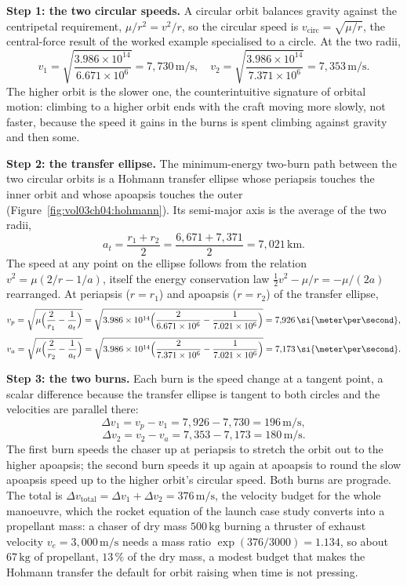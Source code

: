 \textbf{Step 1: the two circular speeds.} A circular orbit balances
gravity against the centripetal requirement, $\mu/r^{2}=v^{2}/r$, so
the circular speed is $v_{\text{circ}}=\sqrt{\mu/r}$, the central-force
result of the worked example specialised to a circle. At the two radii,
\[
v_{1}=\sqrt{\frac{3.986\times 10^{14}}{6.671\times 10^{6}}}=7{,}730\,\si{
\meter\per\second}, \quad
v_{2}=\sqrt{\frac{3.986\times 10^{14}}{7.371\times 10^{6}}}=7{,}353\,\si{
\meter\per\second}.
\]
The higher orbit is the slower one, the counterintuitive signature of
orbital motion: climbing to a higher orbit ends with the craft moving
more slowly, not faster, because the speed it gains in the burns is
spent climbing against gravity and then some.

\textbf{Step 2: the transfer ellipse.} The minimum-energy two-burn
path between the two circular orbits is a Hohmann transfer ellipse whose
periapsis touches the inner orbit and whose apoapsis touches the outer
(Figure~\ref{fig:vol03ch04:hohmann}). Its semi-major axis is the
average of the two radii,
\[
a_{t}=\frac{r_{1}+r_{2}}{2}=\frac{6{,}671+7{,}371}{2}=7{,}021\,\si{\kilo
\meter}.
\]
The speed at any point on the ellipse follows from the
 relation $v^{2}=\mu(2/r-1/a)$, itself the energy
conservation law $\tfrac{1}{2}v^{2}-\mu/r=-\mu/(2a)$ rearranged. At
periapsis ($r=r_{1}$) and apoapsis ($r=r_{2}$) of the transfer ellipse,
\[
v_{p}=\sqrt{\mu\Bigl(\frac{2}{r_{1}}-\frac{1}{a_{t}}\Bigr)}=\sqrt{3.986
\times 10^{14}\Bigl(\frac{2}{6.671\times 10^{6}}-\frac{1}{7.021\times
10^{6}}\Bigr)}=7{,}926\,\si{\meter\per\second},
\]
\[
v_{a}=\sqrt{\mu\Bigl(\frac{2}{r_{2}}-\frac{1}{a_{t}}\Bigr)}=\sqrt{3.986
\times 10^{14}\Bigl(\frac{2}{7.371\times 10^{6}}-\frac{1}{7.021\times
10^{6}}\Bigr)}=7{,}173\,\si{\meter\per\second}.
\]

\textbf{Step 3: the two burns.} Each burn is the speed change at a
tangent point, a scalar difference because the transfer ellipse is
tangent to both circles and the velocities are parallel there:
\[
\Delta v_{1}=v_{p}-v_{1}=7{,}926-7{,}730=196\,\si{\meter\per\second},
\]
\[
\Delta v_{2}=v_{2}-v_{a}=7{,}353-7{,}173=180\,\si{\meter\per\second}.
\]
The first burn speeds the chaser up at periapsis to stretch the orbit
out to the higher apoapsis; the second burn speeds it up again at
apoapsis to round the slow apoapsis speed up to the higher orbit's
circular speed. Both burns are prograde. The total is $\Delta v_{\text{
total}}=\Delta v_{1}+\Delta v_{2}=376\,\si{\meter\per\second}$, the
velocity budget for the whole manoeuvre, which the rocket equation of
the launch case study converts into a propellant mass: a chaser of dry
mass $500\,\si{\kilogram}$ burning a thruster of exhaust velocity
$v_{e}=3{,}000\,\si{\meter\per\second}$ needs a mass ratio $\exp(376/
3000)=1.134$, so about $67\,\si{\kilogram}$ of propellant, $13\,\%$ of
the dry mass, a modest budget that makes the Hohmann transfer the
default for orbit raising when time is not pressing.

